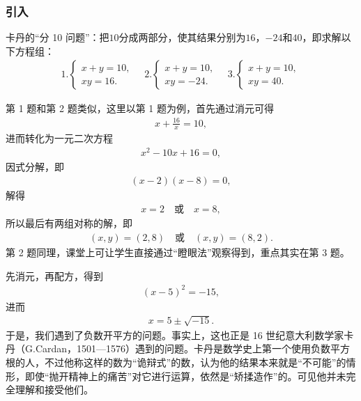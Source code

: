 \subsubsection{引入}
\begin{activity}
    卡丹的“分 10 问题”：把$10$分成两部分，使其结果分别为$16$，$-24$和$40$，即求解以下方程组：
    \begin{align*}
        1. \begin{cases}
               x+y=10, \\
               xy=16.
           \end{cases}
        \quad
        2. \begin{cases}
               x+y=10, \\
               xy=-24.
           \end{cases}
        \quad
        3. \begin{cases}
               x+y=10, \\
               xy=40.
           \end{cases}
    \end{align*}
\end{activity}

\begin{solution}
    第 1 题和第 2 题类似，这里以第 1 题为例，首先通过消元可得
    \begin{align*}
        x+\frac{16}{x}=10,
    \end{align*}
    进而转化为一元二次方程
    \begin{align*}
        x^2-10x+16=0,
    \end{align*}
    因式分解，即
    \begin{align*}
        (x-2)(x-8)=0,
    \end{align*}
    解得
    \begin{align*}
        x=2 \quad \text{或} \quad x=8,
    \end{align*}
    所以最后有两组对称的解，即
    \begin{align*}
        (x,y)=(2,8) \quad \text{或} \quad (x,y)=(8,2).
    \end{align*}
    第 2 题同理，课堂上可让学生直接通过“瞪眼法”观察得到，重点其实在第 3 题。

    先消元，再配方，得到
    \begin{align*}
        (x-5)^2=-15,
    \end{align*}
    进而
    \begin{align*}
        x = 5\pm\sqrt{-15}.
    \end{align*}
    于是，我们遇到了负数开平方的问题。事实上，这也正是 16 世纪意大利数学家卡丹（G.Cardan，1501—1576）遇到的问题。卡丹是数学史上第一个使用负数平方根的人，不过他称这样的数为“诡辩式”的数，认为他的结果本来就是“不可能”的情形，即使“抛开精神上的痛苦”对它进行运算，依然是“矫揉造作”的。可见他并未完全理解和接受他们。
\end{solution}

